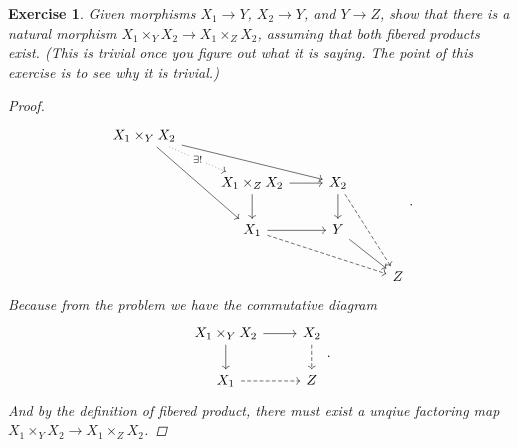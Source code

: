 \documentclass{article}
\theoremstyle{breakstyle}
\newtheorem{exercise}{Exercise}[section]
\begin{document}
\begin{exercise}
Given morphisms $X_{1} \rightarrow Y$, $X_{2} \rightarrow Y$, and
$Y \rightarrow Z$, show that there is a natural morphism $X_{1} \times_{Y}
X_{2} \rightarrow X_{1} \times_{Z} X_{2}$, assuming that both fibered
products exist. (This is trivial once you figure out what it is saying. The
point of this exercise is to see why it is trivial.)

\begin{proof}
	$$
	\begin{tikzcd}
        X_1\times_Y X_2 \arrow[rdd] \arrow[rrd] \arrow[rd, "\exists!" description, dotted] &                                       &                                   &   \\
                                                                                           & X_1\times_{Z} X_2 \arrow[d] \arrow[r] & X_2 \arrow[d] \arrow[rdd, dashed] &   \\
                                                                                           & X_1 \arrow[r] \arrow[rrd, dashed]     & Y \arrow[rd]                      &   \\
                                                                                           &                                       &                                   & Z
	\end{tikzcd}
	.$$ 
	Because from the problem we have the commutative diagram
	$$
	\begin{tikzcd}
        X_1\times_Y X_2 \arrow[d] \arrow[r] & X_2 \arrow[d, dashed] \\
        X_1 \arrow[r, dashed]               & Z                    
	\end{tikzcd}
	.$$ 
    And by the definition of fibered product, there must exist a unqiue
    factoring map $X_1\times_{Y}X_2\longrightarrow X_{1}\times _{Z}X_2$.
\end{proof}

\end{exercise}
\end{document}
